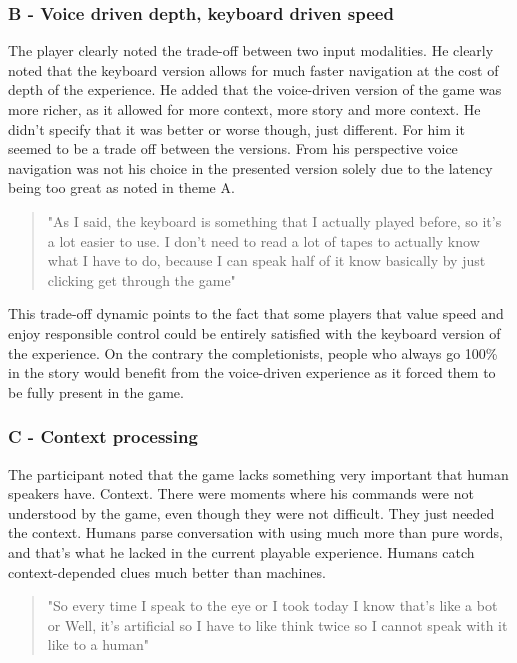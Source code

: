 \subsubsection{B - Voice driven depth, keyboard driven speed}

The player clearly noted the trade-off between two input modalities. He clearly noted that the keyboard version allows for much faster navigation at the cost of depth of the experience. He added that the voice-driven version of the game was more richer, as it allowed for more context, more story and more context. He didn't specify that it was better or worse though, just different. For him it seemed to be a trade off between the versions. From his perspective voice navigation was not his choice in the presented version solely due to the latency being too great as noted in theme A. 

\begin{quote}
    "As I said, the keyboard is something that I actually played before, so it's a lot easier to use.
    I don't need to read a lot of tapes to actually know what I have to do, because I can speak half of it
    know basically by just clicking get through the game"
\end{quote}

This trade-off dynamic points to the fact that some players that value speed and enjoy responsible control could be entirely satisfied with the keyboard version of the experience. On the contrary the completionists, people who always go 100\% in the story would benefit from the voice-driven experience as it forced them to be fully present in the game.


\subsubsection{C - Context processing}

The participant noted that the game lacks something very important that human speakers have. Context. There were moments where his commands were not understood by the game, even though they were not difficult. They just needed the context. Humans parse conversation with using much more than pure words, and that's what he lacked in the current playable experience. Humans catch context-depended clues much better than machines. 

\begin{quote}
    "So every time I speak to the eye or I took today I know that's like a bot or Well, it's artificial so I have to like think twice so I cannot speak with it like to a human"
\end{quote}


